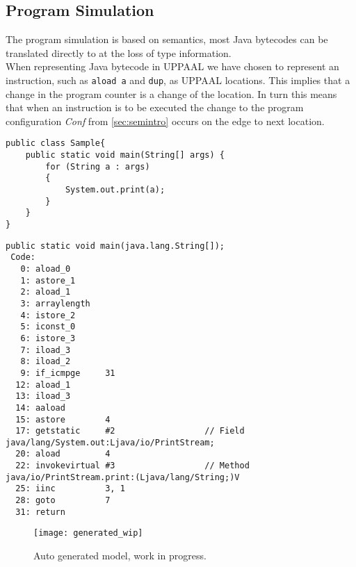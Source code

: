 \subsection{Program Simulation}
The program simulation is based on \jcl semantics, most Java bytecodes can be translated directly to \jcl at the loss of type information.\\
When representing Java bytecode in UPPAAL we have chosen to represent an instruction, such as \texttt{aload a} and \texttt{dup}, as UPPAAL locations. 
This implies that a change in the program counter is a change of the location. 
In turn this means that when an instruction is to be executed the change to the program configuration \textit{Conf} from  \cref{sec:semintro} occurs on the edge to next location.

\begin{minipage}{\linewidth}
\begin{lstlisting}[caption=Java code sample.]
public class Sample{
    public static void main(String[] args) {
        for (String a : args)         
        {
            System.out.print(a);
        }
    }
}
\end{lstlisting}
\end{minipage}
\begin{minipage}{\linewidth}
\begin{lstlisting}[caption=Bytecode sample.]
public static void main(java.lang.String[]);
 Code:
   0: aload_0       
   1: astore_1      
   2: aload_1       
   3: arraylength   
   4: istore_2      
   5: iconst_0      
   6: istore_3      
   7: iload_3       
   8: iload_2       
   9: if_icmpge     31
  12: aload_1       
  13: iload_3       
  14: aaload        
  15: astore        4
  17: getstatic     #2                  // Field java/lang/System.out:Ljava/io/PrintStream;
  20: aload         4
  22: invokevirtual #3                  // Method java/io/PrintStream.print:(Ljava/lang/String;)V
  25: iinc          3, 1
  28: goto          7
  31: return        

\end{lstlisting}
\end{minipage}

\begin{figure}[H]
\texttt{[image: generated\_wip]}
\caption{Auto generated model, work in progress.}
\label{fig:generated_wip}
\end{figure}

